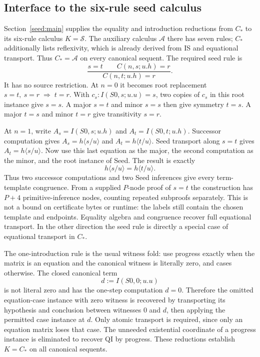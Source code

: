 \subsection{Interface to the six-rule seed calculus}

Section~\ref{seed:main} supplies the equality and introduction reductions
from $C_*$ to its six-rule calculus $K=\mathcal S$. The auxiliary calculus
$\mathcal A$ there has seven rules; $C_*$ additionally lists reflexivity,
which is already derived from IS and equational transport. Thus
$C_*=\mathcal A$ on every canonical sequent.  The required seed rule is
\[
 \frac{s=t\qquad C(n,s;u.h)=r}{C(n,t;u.h)=r}.
\]
It has no source restriction.  At $n=0$ it becomes root replacement
$s=t,\ s=r\;\Longrightarrow\;t=r$.  With
$c_s:I(S0,s;u.u)=s$, two copies of $c_s$ in this root instance give
$s=s$.  A major $s=t$ and minor $s=s$ then give symmetry $t=s$.
A major $t=s$ and minor $t=r$ give transitivity $s=r$.

At $n=1$, write $A_s=I(S0,s;u.h)$ and $A_t=I(S0,t;u.h)$.
Successor computation gives $A_s=h\langle s/u\rangle$ and
$A_t=h\langle t/u\rangle$.  Seed transport along $s=t$ gives
$A_t=h\langle s/u\rangle$.  Now use this last equation as the major,
the second computation as the minor, and the root instance of Seed.
The result is exactly
\[
 h\langle s/u\rangle=h\langle t/u\rangle.
\]
Thus two successor computations and two Seed inferences give every
term-template congruence.  From a supplied $P$-node proof of $s=t$ the
construction has $P+4$ primitive-inference nodes, counting repeated
subproofs separately.  This is not a bound on certificate bytes or
runtime: the labels still contain the chosen template and endpoints.
Equality algebra and congruence recover full equational transport.
In the other direction the seed rule is directly a special case of
equational transport in $C_*$.

The one-introduction rule is the usual witness fold: use progress exactly
when the matrix is an equation and the canonical witness is literally
zero, and cases otherwise.  The closed canonical term
\[
 d:=I(S0,0;u.u)
\]
is not literal zero and has the one-step computation $d=0$.  Therefore
the omitted equation-case instance with zero witness is recovered by
transporting its hypothesis and conclusion between witnesses $0$ and
$d$, then applying the permitted case instance at $d$.  Only atomic
transport is required, since only an equation matrix loses that case.
The unneeded existential coordinate of a progress instance is eliminated
to recover QI by progress.  These reductions establish $K=C_*$ on all
canonical sequents.

